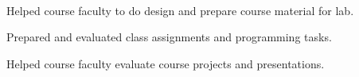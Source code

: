  \\

\vspace{\topsep} %
\begin{tightitemize}
\item Helped course faculty to do design and prepare course material for lab. 
\item Prepared and evaluated class assignments and programming tasks.
\item Helped course faculty evaluate course projects and presentations.
\end{tightitemize}

\sectionspace %